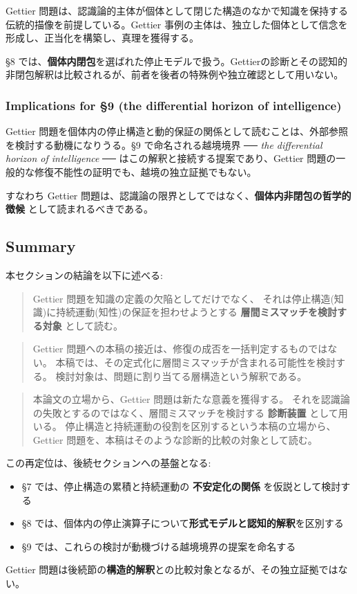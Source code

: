 Gettier 問題は、認識論的主体が個体として閉じた構造のなかで知識を保持する伝統的描像を前提している。Gettier 事例の主体は、独立した個体として信念を形成し、正当化を構築し、真理を獲得する。

\S{}8 では、\textbf{個体内閉包}を選ばれた停止モデルで扱う。Gettierの診断とその認知的非閉包解釈は比較されるが、前者を後者の特殊例や独立確認として用いない。

\subsubsection{Implications for \S{}9 (the differential horizon of intelligence)}


Gettier 問題を個体内の停止構造と動的保証の関係として読むことは、外部参照を検討する動機になりうる。\S{}9 で命名される越境境界 ── \emph{the differential horizon of intelligence} ── はこの解釈と接続する提案であり、Gettier 問題の一般的な修復不能性の証明でも、越境の独立証拠でもない。

すなわち Gettier 問題は、認識論の限界としてではなく、\textbf{個体内非閉包の哲学的徴候} として読まれるべきである。

\subsection{Summary}


本セクションの結論を以下に述べる:

\begin{quote}
Gettier 問題を知識の定義の欠陥としてだけでなく、
それは停止構造(知識)に持続運動(知性)の保証を担わせようとする
\textbf{層間ミスマッチを検討する対象} として読む。
\end{quote}

\begin{quote}
Gettier 問題への本稿の接近は、修復の成否を一括判定するものではない。
本稿では、その定式化に層間ミスマッチが含まれる可能性を検討する。
検討対象は、問題に割り当てる層構造という解釈である。
\end{quote}

\begin{quote}
本論文の立場から、Gettier 問題は新たな意義を獲得する。
それを認識論の失敗とするのではなく、層間ミスマッチを検討する \textbf{診断装置} として用いる。
停止構造と持続運動の役割を区別するという本稿の立場から、
Gettier 問題を、本稿はそのような診断的比較の対象として読む。
\end{quote}

この再定位は、後続セクションへの基盤となる:

\begin{itemize}
\item \S{}7 では、停止構造の累積と持続運動の \textbf{不安定化の関係} を仮説として検討する
\item \S{}8 では、個体内の停止演算子について\textbf{形式モデルと認知的解釈}を区別する
\item \S{}9 では、これらの検討が動機づける越境境界の提案を命名する
\end{itemize}

Gettier 問題は後続節の\textbf{構造的解釈}との比較対象となるが、その独立証拠ではない。
